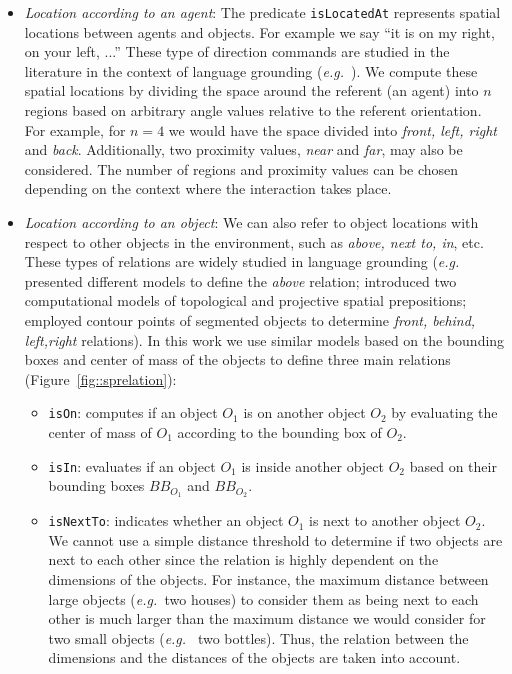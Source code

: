 \documentclass[twocolumn]{svjour3}
\newcommand{\concept}[1]{{\footnotesize \texttt{#1}}}
\newcommand{\eg}{{\textit{e.g.~}}}
\begin{document}
\begin{itemize} 

\item \emph{Location according to an agent}: The predicate
\concept{isLocatedAt} represents spatial locations between agents and objects.
For example we say ``it is on my right, on your left, ...'' These type of direction commands are studied
in the literature in the context of language grounding (\eg \cite{O'Keefe1999,Matuszek2010}). We compute these
spatial locations by dividing the space around the referent (an agent) into $n$
regions based on arbitrary angle values relative to the referent orientation.
For example, for $n = 4$ we would have the space divided into \emph{front,
left, right} and \emph{back}. Additionally, two proximity values, \emph{near}
and \emph{far}, may also be considered. The number of regions and proximity
values can be chosen depending on the context where the interaction takes
place.

\item \emph{Location according to an object}: We can also refer to object
locations with respect to other objects in the environment, such as \emph{above,
next to, in}, etc. These types of relations are widely studied in language
grounding (\eg \cite{Regier2001} presented different models to define the
\emph{above} relation; \cite{Kelleher2009} introduced two computational models of topological and projective spatial prepositions; \cite{Blisard2005} employed contour points of segmented objects to determine \emph{front, behind, left,right} relations). In this work we use similar models based on the
bounding boxes and center of mass of the objects to define three main relations
(Figure~\ref{fig::sprelation}): 

\begin{itemize}
	\item \concept{isOn}: computes if an object $O_1$ is on another object $O_2$ by
	evaluating the center of mass of $O_1$ according to the bounding box of $O_2$.

	\item \concept{isIn}: evaluates if an object $O_1$ is inside another object
	$O_2$ based on their bounding boxes $BB_{O_1}$ and $BB_{O_2}$.

	\item \concept{isNextTo}: indicates whether an object $O_1$ is next to another
	object $O_2$. We cannot use a simple distance threshold to determine if two
	objects are next to each other since the relation is highly dependent on the
	dimensions of the objects. For instance, the maximum distance between large
	objects (\eg two houses) to consider them as being next to each other is much
	larger than the maximum distance we would consider for two small objects (\eg
	two bottles). Thus, the relation between the dimensions and the distances of
	the objects are taken into account.  


\end{itemize}
\end{itemize}
\end{document}
